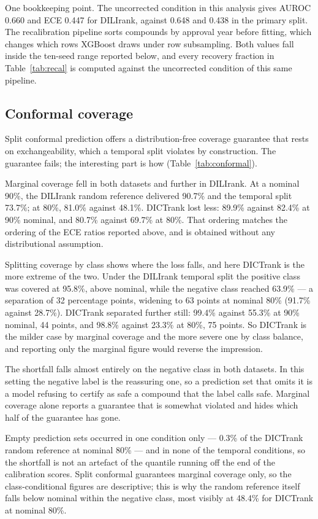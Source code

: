 One bookkeeping point. The uncorrected condition in this analysis gives AUROC
0.660 and ECE 0.447 for DILIrank, against 0.648 and 0.438 in the primary split.
The recalibration pipeline sorts compounds by approval year before fitting, which
changes which rows XGBoost draws under row subsampling. Both values fall inside
the ten-seed range reported below, and every recovery fraction in
Table~\ref{tab:recal} is computed against the uncorrected condition of this same
pipeline.

\subsection{Conformal coverage}

Split conformal prediction offers a distribution-free coverage guarantee that
rests on exchangeability, which a temporal split violates by construction. The
guarantee fails; the interesting part is how (Table~\ref{tab:conformal}).

Marginal coverage fell in both datasets and further in DILIrank. At a nominal
90\%, the DILIrank random reference delivered 90.7\% and the temporal split
73.7\%; at 80\%, 81.0\% against 48.1\%. DICTrank lost less: 89.9\% against 82.4\%
at 90\% nominal, and 80.7\% against 69.7\% at 80\%. That ordering matches the
ordering of the ECE ratios reported above, and is obtained without any
distributional assumption.

Splitting coverage by class shows where the loss falls, and here DICTrank is the
more extreme of the two. Under the DILIrank temporal split the positive class was
covered at 95.8\%, above nominal, while the negative class reached 63.9\% --- a
separation of 32 percentage points, widening to 63 points at nominal 80\% (91.7\%
against 28.7\%). DICTrank separated further still: 99.4\% against 55.3\% at 90\%
nominal, 44 points, and 98.8\% against 23.3\% at 80\%, 75 points. So DICTrank is
the milder case by marginal coverage and the more severe one by class balance,
and reporting only the marginal figure would reverse the impression.

The shortfall falls almost entirely on the negative class in both datasets. In
this setting the negative label is the reassuring one, so a prediction set that
omits it is a model refusing to certify as safe a compound that the label calls
safe. Marginal coverage alone reports a guarantee that is somewhat violated and
hides which half of the guarantee has gone.

Empty prediction sets occurred in one condition only --- 0.3\% of the DICTrank
random reference at nominal 80\% --- and in none of the temporal conditions, so
the shortfall is not an artefact of the quantile running off the end of the
calibration scores. Split conformal guarantees marginal coverage only, so the
class-conditional figures are descriptive; this is why the random reference itself
falls below nominal within the negative class, most visibly at 48.4\% for DICTrank
at nominal 80\%.

